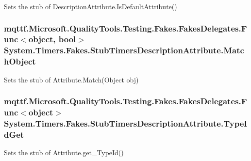 Sets the stub of Description\-Attribute.\-Is\-Default\-Attribute()

\hypertarget{class_system_1_1_timers_1_1_fakes_1_1_stub_timers_description_attribute_ae3c06c1eeaedfbfe7117d2b92b8bf035}{
\subsubsection[{Match\-Object}]{\setlength{\rightskip}{0pt plus 5cm}mqttf.\-Microsoft.\-Quality\-Tools.\-Testing.\-Fakes.\-Fakes\-Delegates.\-Func$<$object, bool$>$ System.\-Timers.\-Fakes.\-Stub\-Timers\-Description\-Attribute.\-Match\-Object}}\label{class_system_1_1_timers_1_1_fakes_1_1_stub_timers_description_attribute_ae3c06c1eeaedfbfe7117d2b92b8bf035}


Sets the stub of Attribute.\-Match(\-Object obj)

\hypertarget{class_system_1_1_timers_1_1_fakes_1_1_stub_timers_description_attribute_a2e385e781f341ffd0cb7bebb3fb9a76d}{
\subsubsection[{Type\-Id\-Get}]{\setlength{\rightskip}{0pt plus 5cm}mqttf.\-Microsoft.\-Quality\-Tools.\-Testing.\-Fakes.\-Fakes\-Delegates.\-Func$<$object$>$ System.\-Timers.\-Fakes.\-Stub\-Timers\-Description\-Attribute.\-Type\-Id\-Get}}\label{class_system_1_1_timers_1_1_fakes_1_1_stub_timers_description_attribute_a2e385e781f341ffd0cb7bebb3fb9a76d}


Sets the stub of Attribute.\-get\-\_\-\-Type\-Id()



